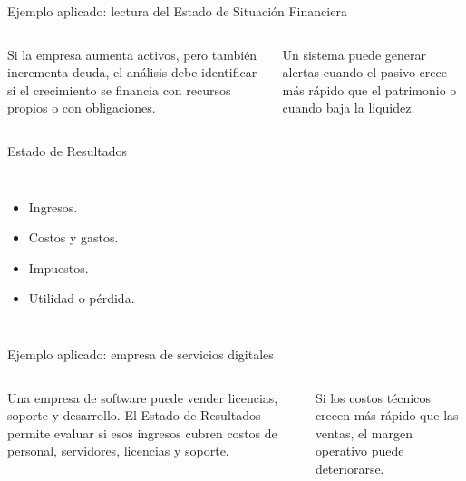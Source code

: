 \begin{frame}{Ejemplo aplicado: lectura del Estado de Situación Financiera}
  \begin{columns}[T,onlytextwidth]
    \footnotesize
    Si la empresa aumenta activos, pero también incrementa deuda, el análisis debe identificar si el crecimiento se financia con recursos propios o con obligaciones.

    \vspace{0.5em}
    Un sistema puede generar alertas cuando el pasivo crece más rápido que el patrimonio o cuando baja la liquidez.
  \end{columns}
\end{frame}

\begin{frame}{Estado de Resultados}
  \begin{columns}[T,onlytextwidth]
    \begin{itemize}
      \item Ingresos.
      \item Costos y gastos.
      \item Impuestos.
      \item Utilidad o pérdida.
    \end{itemize}
  \end{columns}
\end{frame}

\begin{frame}{Ejemplo aplicado: empresa de servicios digitales}
  \begin{columns}[T,onlytextwidth]
    \footnotesize
    Una empresa de software puede vender licencias, soporte y desarrollo. El Estado de Resultados permite evaluar si esos ingresos cubren costos de personal, servidores, licencias y soporte.

    \vspace{0.5em}
    Si los costos técnicos crecen más rápido que las ventas, el margen operativo puede deteriorarse.
  \end{columns}
\end{frame}

